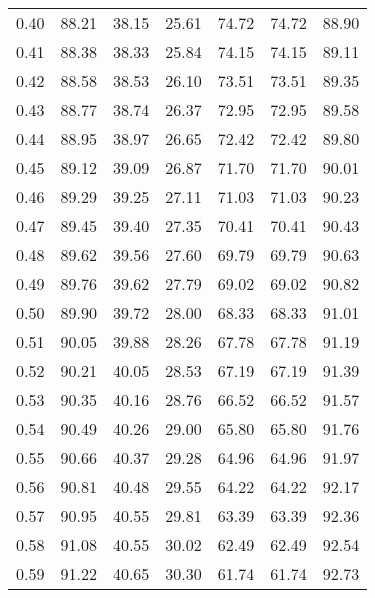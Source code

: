\begin{tabular}{|c|c|c|c|c|c|c|}
      0.40 &     88.21 &     38.15 &      25.61 &   74.72 &      74.72 &         88.90 \\
      0.41 &     88.38 &     38.33 &      25.84 &   74.15 &      74.15 &         89.11 \\
      0.42 &     88.58 &     38.53 &      26.10 &   73.51 &      73.51 &         89.35 \\
      0.43 &     88.77 &     38.74 &      26.37 &   72.95 &      72.95 &         89.58 \\
      0.44 &     88.95 &     38.97 &      26.65 &   72.42 &      72.42 &         89.80 \\
      0.45 &     89.12 &     39.09 &      26.87 &   71.70 &      71.70 &         90.01 \\
      0.46 &     89.29 &     39.25 &      27.11 &   71.03 &      71.03 &         90.23 \\
      0.47 &     89.45 &     39.40 &      27.35 &   70.41 &      70.41 &         90.43 \\
      0.48 &     89.62 &     39.56 &      27.60 &   69.79 &      69.79 &         90.63 \\
      0.49 &     89.76 &     39.62 &      27.79 &   69.02 &      69.02 &         90.82 \\
      0.50 &     89.90 &     39.72 &      28.00 &   68.33 &      68.33 &         91.01 \\
      0.51 &     90.05 &     39.88 &      28.26 &   67.78 &      67.78 &         91.19 \\
      0.52 &     90.21 &     40.05 &      28.53 &   67.19 &      67.19 &         91.39 \\
      0.53 &     90.35 &     40.16 &      28.76 &   66.52 &      66.52 &         91.57 \\
      0.54 &     90.49 &     40.26 &      29.00 &   65.80 &      65.80 &         91.76 \\
      0.55 &     90.66 &     40.37 &      29.28 &   64.96 &      64.96 &         91.97 \\
      0.56 &     90.81 &     40.48 &      29.55 &   64.22 &      64.22 &         92.17 \\
      0.57 &     90.95 &     40.55 &      29.81 &   63.39 &      63.39 &         92.36 \\
      0.58 &     91.08 &     40.55 &      30.02 &   62.49 &      62.49 &         92.54 \\
      0.59 &     91.22 &     40.65 &      30.30 &   61.74 &      61.74 &         92.73 \\

\end{tabular}
